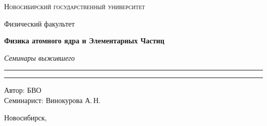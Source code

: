 \documentclass[12pt,a4paper]{report}
\begin{document}
\begin{titlepage}
    \thispagestyle{empty}

    \begin{center}
        \vspace*{1.5cm}

        {\Large\scshape Новосибирский государственный университет\par}
        \vspace{0.25cm}
        {\large Физический факультет\par}

        \vfill

        {\Huge\bfseries Физика атомного ядра и Элементарных Частиц\par}

        \vspace{0.45cm}

        {\Large\itshape Семинары выжившего\par}

        \vspace{0.8cm}

        \rule{0.72\linewidth}{0 pt}



        \rule{2\linewidth}{0pt}

        \vfill

        \begin{flushright}
            \large
            Автор: БВО\\[0.25cm]
            Семинарист: Винокурова А.\,Н.
        \end{flushright}

        \vspace{1.2cm}

        {\large Новосибирск, \the\year}

    \end{center}
\end{titlepage}

\tableofcontents
\newpage



\clearpage
\end{document}
